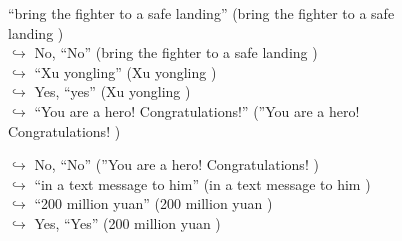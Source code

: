 \documentclass[11pt,a4paper, onecolumn]{article}
\begin{document}
\begin{figure}[t]
\begin{tcolorbox}[boxsep=0pt,left=5pt,right=0pt,top=2pt,colback = yellow!5]
\begin{dialogue}
{ ``bring the fighter to a safe landing'' (bring the fighter to a safe landing ) }
\\
\colorbox{pink!25}{$\hookrightarrow$}
\colorbox{red!25}{No,}
{ ``No'' (bring the fighter to a safe landing ) }
\\
\colorbox{pink!25}{$\hookrightarrow$}
{ ``Xu yongling'' (Xu yongling ) }
\\
\colorbox{pink!25}{$\hookrightarrow$}
\colorbox{red!25}{Yes,}
{ ``yes'' (Xu yongling ) }
\\
\colorbox{pink!25}{$\hookrightarrow$}
{ ``You are a hero! Congratulations!'' (''You are a hero! Congratulations! ) }
 \end{dialogue}\end{tcolorbox}\end{figure}\begin{figure}[t] \small \begin{tcolorbox}[boxsep=0pt,left=5pt,right=0pt,top=2pt,colback = yellow!5] \begin{dialogue}
 \small 
\colorbox{pink!25}{$\hookrightarrow$}
\colorbox{red!25}{No,}
{ ``No'' (''You are a hero! Congratulations! ) }
\\
\colorbox{pink!25}{$\hookrightarrow$}
{ ``in a text message to him'' (in a text message to him ) }
\\
\colorbox{pink!25}{$\hookrightarrow$}
{ ``200 million yuan'' (200 million yuan ) }
\\
\colorbox{pink!25}{$\hookrightarrow$}
\colorbox{red!25}{Yes,}
{ ``Yes'' (200 million yuan ) }
\\
 \end{dialogue}\end{tcolorbox}\end{figure}
\end{document}
